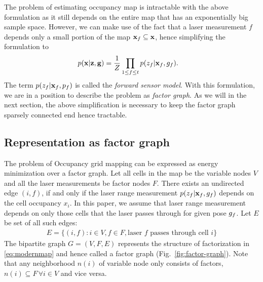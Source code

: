 \documentclass[letterpaper, 10 pt, conference]{ieeeconf} %
\begin{document}
The problem of estimating occupancy map is intractable with the above
formulation as it still depends on the entire map that has an exponentially
big sample space. However, we can make use of the fact that
a laser measurement $f$ depends only a small portion of the map $\mathbf{x}_f
\subseteq \mathbf{x}$, hence simplifying the formulation to
\begin{align}
 p(\mathbf{x} | \mathbf{z}, \mathbf{g}) &= \frac{1}{Z} \prod_{1 \le f \le t}
 p(z_f|\mathbf{x}_f, g_f).
 \label{eq:modernmap}
\end{align}
The term $p(z_f|\mathbf{x}_f, p_f)$ is called the \emph{forward sensor model}.
With this formulation, we are in a position to describe the problem as
\emph{factor graph}. As we will in the next section, the above
simplification is necessary to keep the factor graph sparsely connected
end hence tractable.

\subsection{Representation as factor graph}
\label{sec:notation}
The problem of Occupancy grid mapping can be expressed as energy minimization
over a factor graph. Let all cells in the map be the variable nodes $V$ and all
the laser measurements be factor nodes $F$. 
There exists an undirected edge $(i, f)$, if and only if the laser
range measurement $p(z_f|\mathbf{x}_f, g_f)$ depends on the cell occupancy 
$x_i$. In this paper, we assume that laser range measurement depends on only
those cells that the laser passes through for given pose $g_f$. 
Let $E$ be set of all such edges:
\begin{align}
  E = \{(i, f) : i \in V, f \in F, \text{laser $f$ passes through cell $i$}\}
\end{align}
The bipartite graph $G = (V, F, E)$ 
represents the structure of factorization in \eqref{eq:modernmap} and hence
called a factor graph \cite{kschischang2001factor}
(Fig.~\ref{fig:factor-graph}).  Note that any neighborhood $n(i)$ of variable
node only consists of factors, $n(i)\subseteq F \, \forall i \in V$ and vice
versa.
\end{document}
